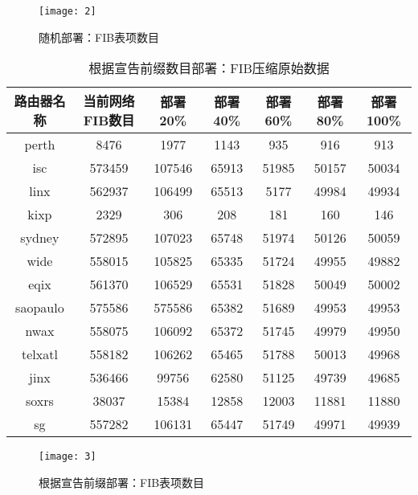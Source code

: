 \begin{figure}
  \centering
  \texttt{[image: 2]}
  \caption{随机部署：FIB表项数目}
  \label{fig:2}
\end{figure}

\begin{table}[h]
    \centering
    \caption{根据宣告前缀数目部署：FIB压缩原始数据}
    \label{tab:prefixorigindata}
        \begin{tabular}{|c|c|c|c|c|c|c|}
            \hline
            路由器名称 & 当前网络FIB数目 & 部署20\% &部署40\% &部署60\% &部署80\% &部署100\% \\ \hline
            perth    & 8476   & 1977   & 1143   & 935   & 916   & 913     \\ \hline
            isc      & 573459 & 107546 & 65913  & 51985 & 50157 & 50034    \\ \hline
            linx     & 562937 & 106499 & 65513  & 5177  & 49984 & 49934     \\ \hline
            kixp     & 2329   & 306    & 208    & 181   & 160   & 146        \\ \hline
            sydney   & 572895 & 107023 & 65748  & 51974 & 50126 & 50059       \\ \hline
            wide     & 558015 & 105825 & 65335  & 51724 & 49955 & 49882        \\ \hline
            eqix     & 561370 & 106529 & 65531  & 51828 & 50049 & 50002         \\ \hline
            saopaulo & 575586 & 575586 & 65382  & 51689 & 49953 & 49953          \\ \hline
            nwax     & 558075 & 106092 & 65372  & 51745 & 49979 & 49950           \\ \hline
            telxatl  & 558182 & 106262 & 65465  & 51788 & 50013 & 49968            \\ \hline
            jinx     & 536466 & 99756  & 62580  & 51125 & 49739 & 49685             \\ \hline
            soxrs    & 38037  & 15384  & 12858  & 12003 & 11881 & 11880              \\ \hline
            sg       & 557282 & 106131 & 65447  & 51749 & 49971 & 49939               \\ \hline
        \end{tabular}
\end{table}

\begin{figure}
  \centering
  \texttt{[image: 3]}
  \caption{根据宣告前缀部署：FIB表项数目}
  \label{fig:3}
\end{figure}

